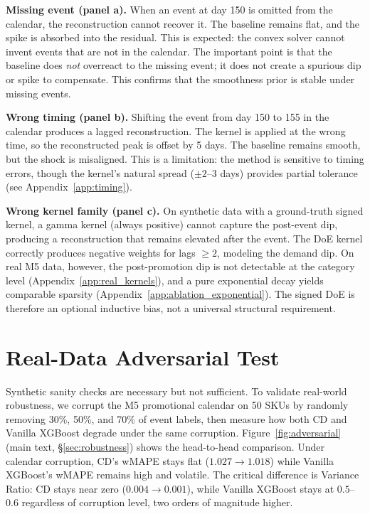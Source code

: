 \documentclass[10pt]{article} %
\theoremstyle{plain}
\theoremstyle{definition}
\begin{document}
\textbf{Missing event (panel a).} When an event at day 150 is omitted from the calendar, the reconstruction cannot recover it. The baseline remains flat, and the spike is absorbed into the residual. This is expected: the convex solver cannot invent events that are not in the calendar. The important point is that the baseline does \emph{not} overreact to the missing event; it does not create a spurious dip or spike to compensate. This confirms that the smoothness prior is stable under missing events.

\textbf{Wrong timing (panel b).} Shifting the event from day 150 to 155 in the calendar produces a lagged reconstruction. The kernel is applied at the wrong time, so the reconstructed peak is offset by 5 days. The baseline remains smooth, but the shock is misaligned. This is a limitation: the method is sensitive to timing errors, though the kernel's natural spread ($\pm 2$--$3$ days) provides partial tolerance (see Appendix~\ref{app:timing}).

\textbf{Wrong kernel family (panel c).} On synthetic data with a ground-truth signed kernel, a gamma kernel (always positive) cannot capture the post-event dip, producing a reconstruction that remains elevated after the event. The DoE kernel correctly produces negative weights for lags $\geq 2$, modeling the demand dip. On real M5 data, however, the post-promotion dip is not detectable at the category level (Appendix~\ref{app:real_kernels}), and a pure exponential decay yields comparable sparsity (Appendix~\ref{app:ablation_exponential}). The signed DoE is therefore an optional inductive bias, not a universal structural requirement.


\section{Real-Data Adversarial Test}
\label{app:adversarial_real}

Synthetic sanity checks are necessary but not sufficient. To validate real-world robustness, we corrupt the M5 promotional calendar on 50 SKUs by randomly removing 30\%, 50\%, and 70\% of event labels, then measure how both CD and Vanilla XGBoost degrade under the same corruption. Figure~\ref{fig:adversarial} (main text, \S\ref{sec:robustness}) shows the head-to-head comparison. Under calendar corruption, CD's wMAPE stays flat ($1.027 \to 1.018$) while Vanilla XGBoost's wMAPE remains high and volatile. The critical difference is Variance Ratio: CD stays near zero ($0.004 \to 0.001$), while Vanilla XGBoost stays at $0.5$--$0.6$ regardless of corruption level, two orders of magnitude higher.
\end{document}

